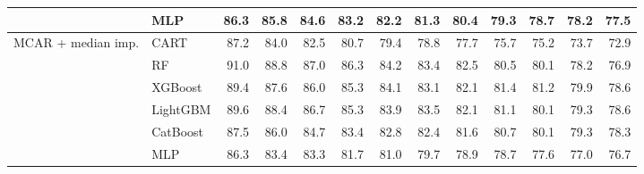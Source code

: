 \begin{table}[p]
\begin{tabular}{@{}llrrrrrrrrrrr@{}}
 & MLP & 86.3 & 85.8 & 84.6 & 83.2 & 82.2 & 81.3 & 80.4 & 79.3 & 78.7 & 78.2 & 77.5 \\
\midrule
MCAR + median imp. & CART & 87.2 & 84.0 & 82.5 & 80.7 & 79.4 & 78.8 & 77.7 & 75.7 & 75.2 & 73.7 & 72.9 \\
 & RF & 91.0 & 88.8 & 87.0 & 86.3 & 84.2 & 83.4 & 82.5 & 80.5 & 80.1 & 78.2 & 76.9 \\
 & XGBoost & 89.4 & 87.6 & 86.0 & 85.3 & 84.1 & 83.1 & 82.1 & 81.4 & 81.2 & 79.9 & 78.6 \\
 & LightGBM & 89.6 & 88.4 & 86.7 & 85.3 & 83.9 & 83.5 & 82.1 & 81.1 & 80.1 & 79.3 & 78.6 \\
 & CatBoost & 87.5 & 86.0 & 84.7 & 83.4 & 82.8 & 82.4 & 81.6 & 80.7 & 80.1 & 79.3 & 78.3 \\
 & MLP & 86.3 & 83.4 & 83.3 & 81.7 & 81.0 & 79.7 & 78.9 & 78.7 & 77.6 & 77.0 & 76.7 \\
\bottomrule
\end{tabular}
\end{table}

